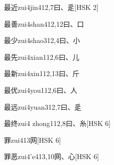 \begin{EntryWithPhonetic}{最近}{zui4jin4}{12,7}{⽈、⾡}[HSK 2]
\end{EntryWithPhonetic}

\begin{EntryWithPhonetic}{最善}{zui4shan4}{12,12}{⽈、⼝}
\end{EntryWithPhonetic}

\begin{EntryWithPhonetic}{最少}{zui4shao3}{12,4}{⽈、⼩}
\end{EntryWithPhonetic}

\begin{EntryWithPhonetic}{最先}{zui4xian1}{12,6}{⽈、⼉}
\end{EntryWithPhonetic}

\begin{EntryWithPhonetic}{最新}{zui4xin1}{12,13}{⽈、⽄}
\end{EntryWithPhonetic}

\begin{EntryWithPhonetic}{最优}{zui4you1}{12,6}{⽈、⼈}
\end{EntryWithPhonetic}

\begin{EntryWithPhonetic}{最远}{zui4yuan3}{12,7}{⽈、⾡}
\end{EntryWithPhonetic}

\begin{EntryWithPhonetic}{最终}{zui4 zhong1}{12,8}{⽈、⽷}[HSK 6]
\end{EntryWithPhonetic}

\begin{EntryWithPhonetic}{罪}{zui4}{13}{⽹}[HSK 6]
\end{EntryWithPhonetic}

\begin{EntryWithPhonetic}{罪恶}{zui4'e4}{13,10}{⽹、⼼}[HSK 6]
\end{EntryWithPhonetic}

